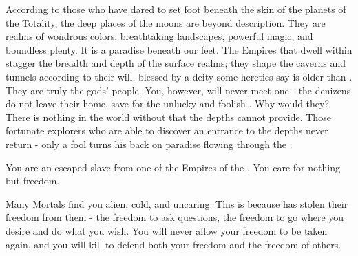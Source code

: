\begin{multicols*}{2}
  According to those who have dared to set foot beneath the skin of the planets of the Totality, the deep places of the moons are beyond description.  They are realms of wondrous colors, breathtaking landscapes, powerful magic, and boundless plenty.  It is a paradise beneath our feet.  The Empires that dwell within stagger the breadth and depth of the surface realms; they shape the caverns and tunnels according to their will, blessed by a deity some heretics say is older than \TheAuthority.  They are truly the gods' people.  You, however, will never meet one - the denizens do not leave their home, save for the unlucky and foolish \Murk.  Why would they?  There is nothing in the world without that the depths cannot provide. Those fortunate explorers who are able to discover an entrance to the depths never return - only a fool turns his back on paradise flowing through the .



  You are an escaped slave from one of the Empires of the .  You care for nothing but freedom.  

  Many Mortals find you alien, cold, and uncaring.  This is because \TheAuthority has stolen their freedom from them - the freedom to ask questions, the freedom to go where you desire and do what you wish.  You will never allow your freedom to be taken again, and you will kill to defend both your freedom and the freedom of others.


\end{multicols*}
